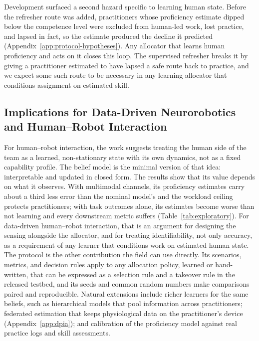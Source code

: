 \documentclass[utf8]{FrontiersinHarvard}
\begin{document}
	Development surfaced a second hazard specific to learning human state. Before the refresher route was added, practitioners whose proficiency estimate dipped below the competence level were excluded from human-led work, lost practice, and lapsed in fact, so the estimate produced the decline it predicted (Appendix~\ref{app:protocol-hypotheses}). Any allocator that learns human proficiency and acts on it closes this loop. The supervised refresher breaks it by giving a practitioner estimated to have lapsed a safe route back to practice, and we expect some such route to be necessary in any learning allocator that conditions assignment on estimated skill.

	\subsection{Implications for Data-Driven Neurorobotics and Human--Robot Interaction}
	\label{sec:implications}

	For human--robot interaction, the work suggests treating the human side of the team as a learned, non-stationary state with its own dynamics, not as a fixed capability profile. The belief model is the minimal version of that idea: interpretable and updated in closed form. The results show that its value depends on what it observes. With multimodal channels, its proficiency estimates carry about a third less error than the nominal model's and the workload ceiling protects practitioners; with task outcomes alone, its estimates become worse than not learning and every downstream metric suffers (Table~\ref{tab:exploratory}). For data-driven human--robot interaction, that is an argument for designing the sensing alongside the allocator, and for treating identifiability, not only accuracy, as a requirement of any learner that conditions work on estimated human state. The protocol is the other contribution the field can use directly. Its scenarios, metrics, and decision rules apply to any allocation policy, learned or hand-written, that can be expressed as a selection rule and a takeover rule in the released testbed, and its seeds and common random numbers make comparisons paired and reproducible. Natural extensions include richer learners for the same beliefs, such as hierarchical models that pool information across practitioners; federated estimation that keeps physiological data on the practitioner's device (Appendix~\ref{app:dpia}); and calibration of the proficiency model against real practice logs and skill assessments.
\end{document}
